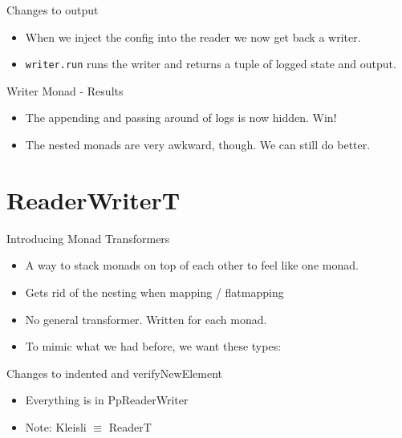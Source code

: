 \documentclass[professionalFonts,aspectratio=169]{beamer}
\begin{document}
\begin{frame}{Changes to output}

\begin{itemize}
  \pause \item When we inject the config into the reader we now get back a writer.
  \pause \item \texttt{writer.run} runs the writer and returns a tuple of logged state and output.
\end{itemize}

\pause



\end{frame}

\begin{frame}{Writer Monad - Results}

\begin{itemize}
\item The appending and passing around of logs is now hidden. Win!
\pause \item The nested monads are very awkward, though. We can still do better.
\end{itemize}

\end{frame}

\section{ReaderWriterT}

\begin{frame}{Introducing Monad Transformers}

\begin{itemize}
\item A way to stack monads on top of each other to feel like one monad.
\pause \item Gets rid of the nesting when mapping / flatmapping
\pause \item No general transformer. Written for each monad.
\pause \item To mimic what we had before, we want these types:
\end{itemize}



\end{frame}

\begin{frame}{Changes to indented and verifyNewElement}

\begin{itemize}
\item Everything is in PpReaderWriter
\pause \item Note: Kleisli $\equiv$ ReaderT
\end{itemize}



\end{frame}
\end{document}
